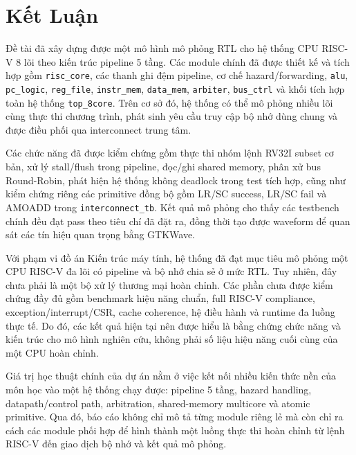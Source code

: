 \chapter{Kết Luận}

Đề tài đã xây dựng được một mô hình mô phỏng RTL cho hệ thống CPU RISC-V 8 lõi theo kiến trúc pipeline 5 tầng. Các module chính đã được thiết kế và tích hợp gồm \texttt{risc\_core}, các thanh ghi đệm pipeline, cơ chế hazard/forwarding, \texttt{alu}, \texttt{pc\_logic}, \texttt{reg\_file}, \texttt{instr\_mem}, \texttt{data\_mem}, \texttt{arbiter}, \texttt{bus\_ctrl} và khối tích hợp toàn hệ thống \texttt{top\_8core}. Trên cơ sở đó, hệ thống có thể mô phỏng nhiều lõi cùng thực thi chương trình, phát sinh yêu cầu truy cập bộ nhớ dùng chung và được điều phối qua interconnect trung tâm.

Các chức năng đã được kiểm chứng gồm thực thi nhóm lệnh RV32I subset cơ bản, xử lý stall/flush trong pipeline, đọc/ghi shared memory, phân xử bus Round-Robin, phát hiện hệ thống không deadlock trong test tích hợp, cũng như kiểm chứng riêng các primitive đồng bộ gồm LR/SC success, LR/SC fail và AMOADD trong \texttt{interconnect\_tb}. Kết quả mô phỏng cho thấy các testbench chính đều đạt pass theo tiêu chí đã đặt ra, đồng thời tạo được waveform để quan sát các tín hiệu quan trọng bằng GTKWave.

Với phạm vi đồ án Kiến trúc máy tính, hệ thống đã đạt mục tiêu mô phỏng một CPU RISC-V đa lõi có pipeline và bộ nhớ chia sẻ ở mức RTL. Tuy nhiên, đây chưa phải là một bộ xử lý thương mại hoàn chỉnh. Các phần chưa được kiểm chứng đầy đủ gồm benchmark hiệu năng chuẩn, full RISC-V compliance, exception/interrupt/CSR, cache coherence, hệ điều hành và runtime đa luồng thực tế. Do đó, các kết quả hiện tại nên được hiểu là bằng chứng chức năng và kiến trúc cho mô hình nghiên cứu, không phải số liệu hiệu năng cuối cùng của một CPU hoàn chỉnh.

Giá trị học thuật chính của dự án nằm ở việc kết nối nhiều kiến thức nền của môn học vào một hệ thống chạy được: pipeline 5 tầng, hazard handling, datapath/control path, arbitration, shared-memory multicore và atomic primitive. Qua đó, báo cáo không chỉ mô tả từng module riêng lẻ mà còn chỉ ra cách các module phối hợp để hình thành một luồng thực thi hoàn chỉnh từ lệnh RISC-V đến giao dịch bộ nhớ và kết quả mô phỏng.
